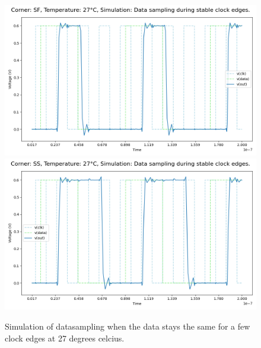 \begin{figure}[H]
    \vspace{5pt}
    \includegraphics[height= 0.21\textheight]{figures/aimspice/SF/27/W3.csv.png}
    \vspace{5pt}
    \includegraphics[height= 0.21\textheight]{figures/aimspice/SS/27/W3.csv.png}
    \caption{Simulation of datasampling when the data stays the same for a few clock edges at 27 degrees celcius.}
    \label{fig:aimspice_W3_27}
\end{figure}

\pagebreak

